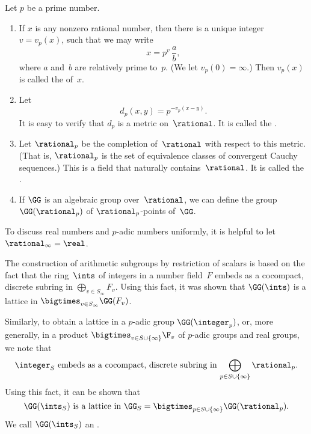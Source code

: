 \begin{defn}
Let $p$ be a prime number. 
\noprelistbreak
	\begin{enumerate}
	\item If $x$ is any nonzero rational number, then there is a unique integer $v = v_p(x)$, such that we may write
		$$ x = p^v \, \frac{a}{b} ,$$
	where $a$ and~$b$ are relatively prime to~$p$. (We let $v_p(0) = \infty$.) Then $v_p(x)$ is called the  of~$x$.
	\item Let
		$$ d_p(x,y) = p^{-v_p(x-y)} .$$
	It is easy to verify that $d_p$ is a metric on~$\rational$. It is called the .
	\item Let $\rational_p$ be the completion of~$\rational$ with respect to this metric. (That is, $\rational_p$ is the set of equivalence classes of convergent Cauchy sequences.) This is a field that naturally contains~$\rational$. It is called the .
	\item If $\GG$ is an algebraic group over~$\rational$, we can define the group $\GG(\rational_p)$ of $\rational_p$-points of~$\GG$.
	\end{enumerate}
\end{defn}

\begin{notation}
To discuss real numbers and $p$-adic numbers uniformly, it is helpful to let 
\nindex{$\rational_\infty = \real$}$\rational_\infty = \real$.
\end{notation}

The construction of arithmetic subgroups by restriction of scalars  is based on the fact that the ring~$\ints$ of integers in a number field~$F$ embeds as a cocompact, discrete subring in $\bigoplus_{v \in S_\infty} F_v$. Using this fact, it was shown that $\GG(\ints)$ is a lattice in $\bigtimes_{v \in S_{\infty}} \GG(F_v)$. 

Similarly, to obtain a lattice in a $p$-adic group $\GG(\integer_p)$, or, more generally, in a product $\bigtimes_{v \in S \cup \{\infty\}} \F_v$ of $p$-adic groups and real  groups, we note that 
	$$ \text{$\integer_S$ embeds as a cocompact, discrete subring in $\bigoplus_{p \in S \cup \{\infty\}} \rational_p$} .$$
Using this fact, it can be shown that 
	$$ \text{$\GG(\ints_S)$ is a lattice in $\GG_S = \bigtimes_{p \in S \cup \{\infty\}} \GG(\rational_p)$} . $$%
%
We call $\GG(\ints_S)$ an .

